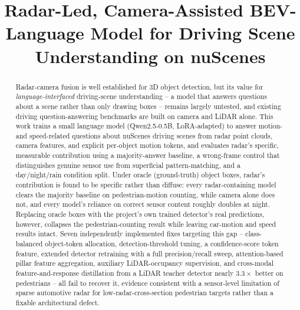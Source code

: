 \documentclass[conference]{IEEEtran}
\begin{document}
\title{Radar-Led, Camera-Assisted BEV-Language Model for Driving Scene Understanding on nuScenes}

\author{
}

\maketitle

\begin{abstract}
Radar-camera fusion is well established for 3D object detection, but its value for \emph{language-interfaced}
driving-scene understanding -- a model that answers questions about a scene rather than only drawing boxes --
remains largely untested, and existing driving question-answering benchmarks are built on camera and LiDAR alone.
This work trains a small language model (Qwen2.5-0.5B, LoRA-adapted) to answer motion- and speed-related
questions about nuScenes driving scenes from radar point clouds, camera features, and explicit per-object motion
tokens, and evaluates radar's specific, measurable contribution using a majority-answer baseline, a wrong-frame
control that distinguishes genuine sensor use from superficial pattern-matching, and a day/night/rain condition
split. Under oracle (ground-truth) object boxes, radar's contribution is found to be specific rather than diffuse:
every radar-containing model clears the majority baseline on pedestrian-motion counting, while camera alone does
not, and every model's reliance on correct sensor content roughly doubles at night. Replacing oracle boxes with
the project's own trained detector's real predictions, however, collapses the pedestrian-counting result while
leaving car-motion and speed results intact. Seven independently implemented fixes targeting this gap --
class-balanced object-token allocation, detection-threshold tuning, a confidence-score token feature, extended
detector retraining with a full precision/recall sweep, attention-based pillar feature aggregation, auxiliary
LiDAR-occupancy supervision, and cross-modal feature-and-response distillation from a LiDAR teacher detector
nearly $3.3\times$ better on pedestrians -- all fail to recover it, evidence consistent with a sensor-level
limitation of sparse automotive radar for low-radar-cross-section pedestrian targets rather than a fixable
architectural defect.
\end{abstract}
\end{document}
